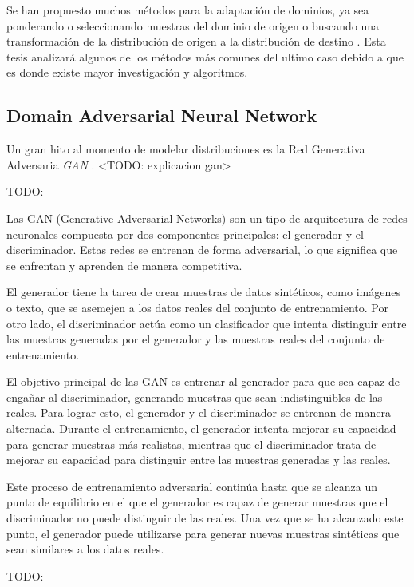 Se han propuesto muchos métodos para la adaptación de dominios, ya sea ponderando o seleccionando muestras del dominio
de origen \parencite{sugiyama2007direct} o buscando una transformación de la distribución de origen a la distribución de destino \parencite{gong2013connecting}. Esta tesis analizará algunos de los métodos más comunes del ultimo caso debido a que es
donde existe mayor investigación y algoritmos.

\subsection{Domain Adversarial Neural Network}
Un gran hito al momento de modelar distribuciones es la Red Generativa Adversaria {\it GAN} \parencite{goodfellow2020generative}. <TODO: explicacion gan>

TODO:

Las GAN (Generative Adversarial Networks) son un tipo de arquitectura de redes neuronales compuesta por dos componentes
principales: el generador y el discriminador. Estas redes se entrenan de forma adversarial, lo que significa que se
enfrentan y aprenden de manera competitiva.

El generador tiene la tarea de crear muestras de datos sintéticos, como imágenes o texto, que se asemejen a los datos
reales del conjunto de entrenamiento. Por otro lado, el discriminador actúa como un clasificador que intenta distinguir
entre las muestras generadas por el generador y las muestras reales del conjunto de entrenamiento.

El objetivo principal de las GAN es entrenar al generador para que sea capaz de engañar al discriminador, generando
muestras que sean indistinguibles de las reales. Para lograr esto, el generador y el discriminador se entrenan de
manera alternada. Durante el entrenamiento, el generador intenta mejorar su capacidad para generar muestras más
realistas, mientras que el discriminador trata de mejorar su capacidad para distinguir entre las muestras generadas y
las reales.

Este proceso de entrenamiento adversarial continúa hasta que se alcanza un punto de equilibrio en el que el generador
es capaz de generar muestras que el discriminador no puede distinguir de las reales. Una vez que se ha alcanzado este
punto, el generador puede utilizarse para generar nuevas muestras sintéticas que sean similares a los datos reales.

TODO:

